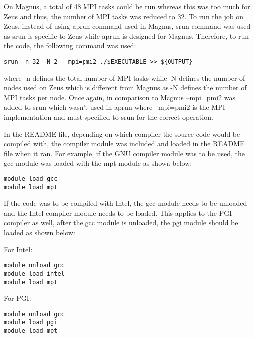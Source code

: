 On Magnus, a total of 48 MPI tasks could be run whereas this was too much for Zeus and thus, the number of MPI tasks was reduced to 32. To run the job
on Zeus, instead of using aprun command used in Magnus, srun command was used as srun is specific to Zeus while aprun is designed for Magnus. Therefore,
to run the code, the following command was used:

\begin{tcolorbox}
\begin{Verbatim}[fontsize=\scriptsize]
srun -n 32 -N 2 --mpi=pmi2 ./$EXECUTABLE >> ${OUTPUT}
\end{Verbatim}
\end{tcolorbox}

where -n defines the total number of MPI tasks while -N defines the number of nodes used on Zeus which is different from Magnus as -N defines the number
of MPI tasks per node. Once again, in comparison to Magnus --mpi=pmi2 was added to srun which wasn't used in aprun where --mpi=pmi2 is the MPI
implementation and must specified to srun for the correct operation.

In the README file, depending on which compiler the source code would be compiled with, the compiler module was included and loaded in the README file 
when it ran. For example, if the GNU compiler module was to be used, the gcc module was loaded with the mpt module as shown below:

\begin{tcolorbox}
\begin{Verbatim}[fontsize=\scriptsize]
module load gcc
module load mpt
\end{Verbatim}
\end{tcolorbox}

If the code was to be compiled with Intel, the gcc module needs to be unloaded and the Intel compiler module needs to be loaded. This applies to the PGI
compiler as well, after the gcc module is unloaded, the pgi module should be loaded as shown below:

For Intel:

\begin{tcolorbox}
\begin{Verbatim}[fontsize=\scriptsize]
module unload gcc
module load intel
module load mpt
\end{Verbatim}
\end{tcolorbox}

For PGI: 

\begin{tcolorbox}
\begin{Verbatim}[fontsize=\scriptsize]
module unload gcc
module load pgi
module load mpt
\end{Verbatim}
\end{tcolorbox}

